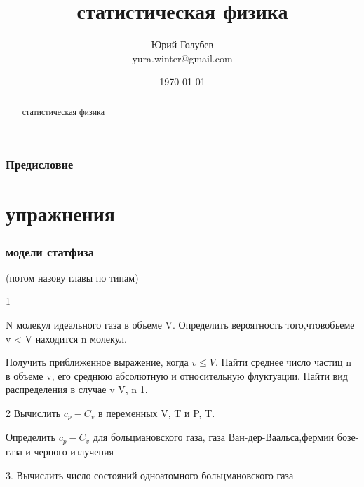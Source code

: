 \documentclass[a4paper,12pt]{article} %
\author{Юрий Голубев\\ yura.winter@gmail.com }
\title{статистическая физика}
\date{\today}
\begin{document}
\maketitle

\begin{abstract}
статистическая физика
\end{abstract}
\tableofcontents

\section*{Предисловие}




\clearpage
\part{упражнения}

\section{модели статфиза}

(потом назову главы по типам)

\begin{task}

1

N молекул идеального газа в объеме V. Определить вероятность того,чтовобъеме v < V находится n молекул.

Получить
приближенное выражение, когда  $v \le V $. Найти среднее число частиц n в объеме v, его среднюю абсолютную и относительную флуктуации. Найти вид распределения в случае v V, n  1. 


\end{task}


\begin{task}

2
Вычислить $ c_p-C_v$ в  переменных V, T и P, T. 

Определить $ c_p-C_v$ для больцмановского газа,
газа Ван-дер-Ваальса,фермии бозе-газа и черного излучения


\end{task}


\begin{task}

3. Вычислить число состояний одноатомного больцмановского газа


\end{task}
\end{document}
